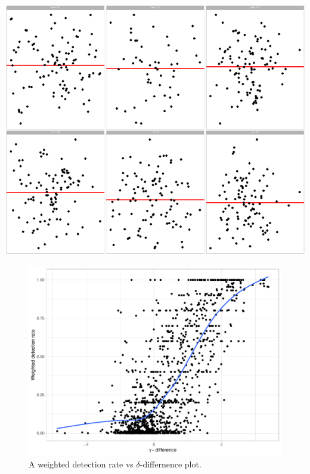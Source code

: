 \documentclass[]{interact}
\theoremstyle{plain}%
\theoremstyle{definition}
\theoremstyle{remark}
\begin{document}
\begin{center}\includegraphics[width=1\linewidth]{paper_files/figure-latex/unnamed-chunk-3-1} \end{center}

\begin{figure}

{\centering \includegraphics[width=1\linewidth]{paper_files/figure-latex/unnamed-chunk-4-1} 

}

\caption{A weighted detection rate vs $\delta$-differnence plot.}\label{fig:unnamed-chunk-4}
\end{figure}
\end{document}
